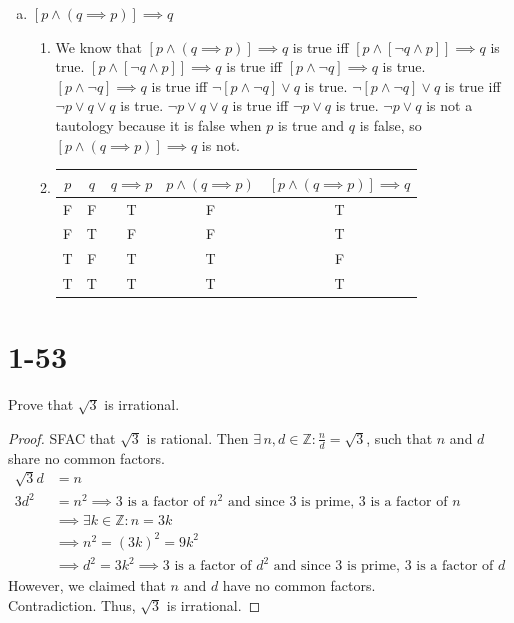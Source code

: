 \documentclass{article}
\begin{document}
\begin{enumerate}[a)]
    \item $[p \land (q \implies p)] \implies q$
        \begin{enumerate}[1)]
            \item We know that $[p \land (q \implies p)] \implies q$ is true iff
                $[p \land [\neg q \land p]] \implies q$ is true. $[p \land [\neg
                q \land p]] \implies q$ is true iff $[p \land \neg q] \implies
                q$ is true. $[p \land \neg q] \implies q$ is true iff $\neg [p
                \land \neg q] \lor q$ is true. $\neg [p \land \neg q] \lor q$ is
                true iff $\neg p \lor q \lor q$ is true. $\neg p \lor q \lor q$
                is true iff $\neg p \lor q$ is true. $\neg p \lor q$ is not a
                tautology because it is false when $p$ is true and $q$ is false,
                so $[p \land (q \implies p)] \implies q$ is not.
            \item 
                \begin{tabular}{ |c|c|c|c|c| }
                    \hline
                    $p$ & $q$ & $q \implies p$ & $p \land (q \implies p)$ & $[p \land (q \implies p)] \implies q$ \\
                    \hline
                    F & F & T & F & T \\
                    F & T & F & F & T \\
                    T & F & T & T & F \\
                    T & T & T & T & T \\
                    \hline
                \end{tabular}
        \end{enumerate}
\end{enumerate}

\newpage

\section{1-53}

Prove that $\sqrt{3}$ is irrational.

\begin{proof}
    SFAC that $\sqrt{3}$ is rational.  Then $\exists \, n,d \in \mathbb{Z} :
    \frac{n}{d} = \sqrt{3}$, such that $n$ and $d$ share no common factors.
    \begin{align*}
        \sqrt{3}d &= n \\
        3d^2 &= n^2 \implies \text{$3$ is a factor of $n^2$ and since $3$ is
        prime, 3 is a factor of $n$} \\
        &\implies \exists k \in \mathbb{Z} : n = 3k \\
        &\implies n^2 = (3k)^2 = 9k^2 \\
        &\implies d^2 = 3k^2 \implies \text{$3$ is a factor of $d^2$ and since
        $3$ is prime, $3$ is a factor of $d$}
    \end{align*}
    However, we claimed that $n$ and $d$ have no common factors. \\
    Contradiction. Thus, $\sqrt{3}$ is irrational.  
\end{proof}
\end{document}
